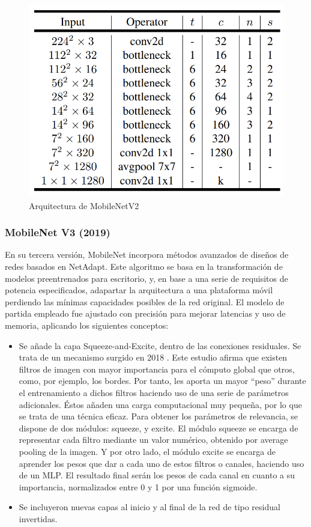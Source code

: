     \begin{figure}[H]
	\label{mv2}
	\centering
	\includegraphics[scale = 0.25]{imagenes/mobilenetv2.png}
	\caption{Arquitectura de MobileNetV2}
\end{figure}

\subsubsection{MobileNet V3 (2019)}

En su tercera versión\cite{howard2019searching}, MobileNet incorpora métodos avanzados de diseños de redes basados en NetAdapt. Este algoritmo se basa en la transformación de modelos preentrenados para escritorio, y, en base a una serie de requisitos de potencia especificados, adapartar la arquitectura a una plataforma móvil perdiendo las mínimas capacidades posibles de la red original.  El modelo de partida empleado fue ajustado con precisión para mejorar latencias y uso de memoria, aplicando los siguientes conceptos:

\begin{itemize}
    \item Se añade la capa Squeeze-and-Excite, dentro de las conexiones residuales. Se trata de un mecanismo surgido en 2018 \cite{hu2019squeezeandexcitation}. Este estudio afirma que existen filtros de imagen con mayor importancia para el cómputo global que otros, como, por ejemplo, los bordes. Por tanto, les aporta un mayor ``peso'' durante el entrenamiento a dichos filtros haciendo uso de una serie de parámetros adicionales. Éstos añaden una carga computacional muy pequeña, por lo que se trata de una técnica eficaz. Para obtener los parámetros de relevancia, se dispone de dos módulos: squeeze, y excite. El módulo squeeze se encarga de representar cada filtro mediante un valor numérico, obtenido por average pooling de la imagen. Y por otro lado, el módulo excite se encarga de aprender los pesos que dar a cada uno de estos filtros o canales, haciendo uso de un MLP. El resultado final serán los pesos de cada canal en cuanto a su importancia, normalizados entre 0 y 1 por una función sigmoide.

    \item Se incluyeron nuevas capas al inicio y al final de la red de tipo residual invertidas.
\end{itemize}

